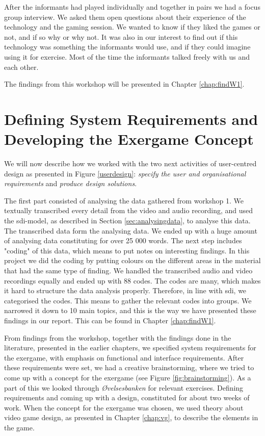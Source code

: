 After the informants had played individually and together in pairs we had a focus group interview. We asked them open questions about their experience of the technology and the gaming session. We wanted to know if they liked the games or not, and if so why or why not. It was also in our interest to find out if this technology was something the informants would use, and if they could imagine using it for exercise. Most of the time the informants talked freely with us and each other.

The findings from this workshop will be presented in Chapter \ref{chap:findW1}.

\section{Defining System Requirements and Developing the Exergame Concept}                
\label{sec:definingconcept}
We will now describe how we worked with the two next activities of user-centred design as presented in Figure \ref{userdesign}: \emph{specify the user and organisational requirements} and \emph{produce design solutions}.

The first part consisted of analysing the data gathered from workshop 1. We textually transcribed every detail from the video and audio recording, and used the \ac{sdi}-model, as described in Section \ref{sec:analysingdata}, to analyse this data. The transcribed data form the analysing data. We ended up with a huge amount of analysing data constituting for over 25 000 words. The next step includes "coding" of this data, which means to put notes on interesting findings. In this project we did the coding by putting colours on the different areas in the material that had the same type of finding. We handled the transcribed audio and video recordings equally and ended up with 88 codes.  The codes are many, which makes it hard to structure the data analysis properly. Therefore, in line with \ac{sdi}, we categorised the codes. This means to gather the relevant codes into groups. We narrowed it down to 10 main topics, and this is the way we have presented these findings in our report. This can be found in Chapter \ref{chap:findW1}. 

From findings from the workshop, together with the findings done in the literature, presented in the earlier chapters, we specified system requirements for the exergame, with emphasis on functional and interface requirements. After these requirements were set, we had a creative brainstorming, where we tried to come up with a concept for the exergame (see Figure \ref{fig:brainstorming}). As a part of this we looked through \emph{Øvelsesbanken} \cite{eldretrening} for relevant exercises. Defining requirements and coming up with a design, constituted for about two weeks of work. When the concept for the exergame was chosen, we used theory about video game design, as presented in Chapter \ref{chap:vg}, to describe the elements in the game.

